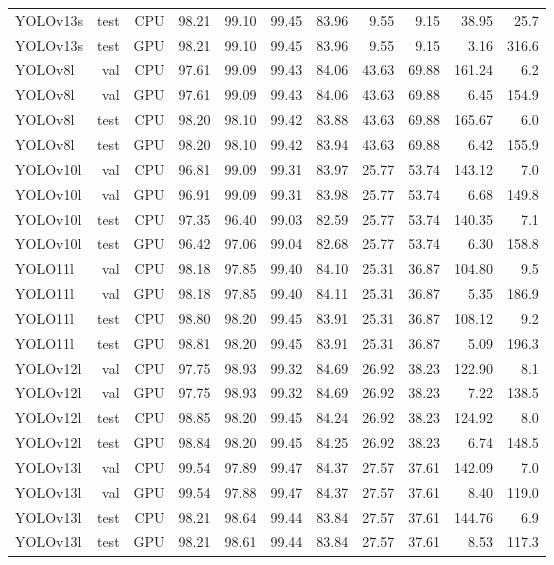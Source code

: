 \begin{table}[t]
{\begin{tabular}{lrrrrrrrrrr}
YOLOv13s & test & CPU & 98.21 & 99.10 & 99.45 & 83.96 & 9.55 & 9.15 & 38.95 & 25.7 \\
YOLOv13s & test & GPU & 98.21 & 99.10 & 99.45 & 83.96 & 9.55 & 9.15 & 3.16 & 316.6 \\
YOLOv8l & val & CPU & 97.61 & 99.09 & 99.43 & 84.06 & 43.63 & 69.88 & 161.24 & 6.2 \\
YOLOv8l & val & GPU & 97.61 & 99.09 & 99.43 & 84.06 & 43.63 & 69.88 & 6.45 & 154.9 \\
YOLOv8l & test & CPU & 98.20 & 98.10 & 99.42 & 83.88 & 43.63 & 69.88 & 165.67 & 6.0 \\
YOLOv8l & test & GPU & 98.20 & 98.10 & 99.42 & 83.94 & 43.63 & 69.88 & 6.42 & 155.9 \\
YOLOv10l & val & CPU & 96.81 & 99.09 & 99.31 & 83.97 & 25.77 & 53.74 & 143.12 & 7.0 \\
YOLOv10l & val & GPU & 96.91 & 99.09 & 99.31 & 83.98 & 25.77 & 53.74 & 6.68 & 149.8 \\
YOLOv10l & test & CPU & 97.35 & 96.40 & 99.03 & 82.59 & 25.77 & 53.74 & 140.35 & 7.1 \\
YOLOv10l & test & GPU & 96.42 & 97.06 & 99.04 & 82.68 & 25.77 & 53.74 & 6.30 & 158.8 \\
YOLO11l & val & CPU & 98.18 & 97.85 & 99.40 & 84.10 & 25.31 & 36.87 & 104.80 & 9.5 \\
YOLO11l & val & GPU & 98.18 & 97.85 & 99.40 & 84.11 & 25.31 & 36.87 & 5.35 & 186.9 \\
YOLO11l & test & CPU & 98.80 & 98.20 & 99.45 & 83.91 & 25.31 & 36.87 & 108.12 & 9.2 \\
YOLO11l & test & GPU & 98.81 & 98.20 & 99.45 & 83.91 & 25.31 & 36.87 & 5.09 & 196.3 \\
YOLOv12l & val & CPU & 97.75 & 98.93 & 99.32 & 84.69 & 26.92 & 38.23 & 122.90 & 8.1 \\
YOLOv12l & val & GPU & 97.75 & 98.93 & 99.32 & 84.69 & 26.92 & 38.23 & 7.22 & 138.5 \\
YOLOv12l & test & CPU & 98.85 & 98.20 & 99.45 & 84.24 & 26.92 & 38.23 & 124.92 & 8.0 \\
YOLOv12l & test & GPU & 98.84 & 98.20 & 99.45 & 84.25 & 26.92 & 38.23 & 6.74 & 148.5 \\
YOLOv13l & val & CPU & 99.54 & 97.89 & 99.47 & 84.37 & 27.57 & 37.61 & 142.09 & 7.0 \\
YOLOv13l & val & GPU & 99.54 & 97.88 & 99.47 & 84.37 & 27.57 & 37.61 & 8.40 & 119.0 \\
YOLOv13l & test & CPU & 98.21 & 98.64 & 99.44 & 83.84 & 27.57 & 37.61 & 144.76 & 6.9 \\
YOLOv13l & test & GPU & 98.21 & 98.61 & 99.44 & 83.84 & 27.57 & 37.61 & 8.53 & 117.3 \\
\bottomrule
\end{tabular}
}
\end{table}

